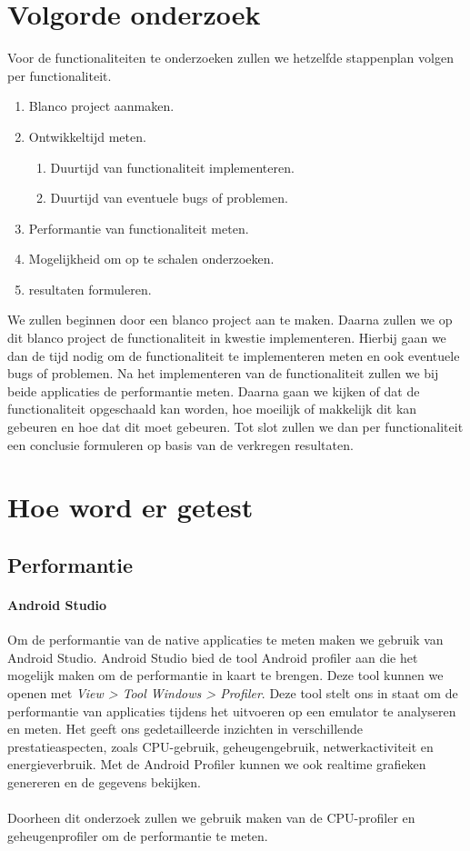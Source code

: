 \section{Volgorde onderzoek}
Voor de functionaliteiten te onderzoeken zullen we hetzelfde stappenplan volgen per functionaliteit. 
\begin{enumerate}
    \item Blanco project aanmaken.
    \item Ontwikkeltijd meten.
    \begin{enumerate}
        \item Duurtijd van functionaliteit implementeren.
        \item Duurtijd van eventuele bugs of problemen.
    \end{enumerate}
    \item Performantie van functionaliteit meten.
    \item Mogelijkheid om op te schalen onderzoeken.
    \item resultaten formuleren.
\end{enumerate}
We zullen beginnen door een blanco project aan te maken. Daarna zullen we op dit blanco project de functionaliteit in kwestie implementeren. 
Hierbij gaan we dan de tijd nodig om de functionaliteit te implementeren meten en ook eventuele bugs of problemen. 
Na het implementeren van de functionaliteit zullen we bij beide applicaties de performantie meten. 
Daarna gaan we kijken of dat de functionaliteit opgeschaald kan worden, hoe moeilijk of makkelijk dit kan gebeuren en hoe dat dit moet gebeuren. 
Tot slot zullen we dan per functionaliteit een conclusie formuleren op basis van de verkregen resultaten.

\section{Hoe word er getest}
\subsection{Performantie}
\paragraph{Android Studio}
Om de performantie van de native applicaties te meten maken we gebruik van Android Studio. 
Android Studio bied de tool Android profiler aan die het mogelijk maken om de performantie in kaart te brengen. 
Deze tool kunnen we openen met \textit{View > Tool Windows > Profiler}. %
Deze tool stelt ons in staat om de performantie van applicaties tijdens het uitvoeren op een emulator te analyseren en meten. 
Het geeft ons gedetailleerde inzichten in verschillende prestatieaspecten, zoals CPU-gebruik, geheugengebruik, netwerkactiviteit en energieverbruik. 
Met de Android Profiler kunnen we ook realtime grafieken genereren en de gegevens bekijken. 
\\\\
Doorheen dit onderzoek zullen we gebruik maken van de CPU-profiler en geheugenprofiler om de performantie te meten.

